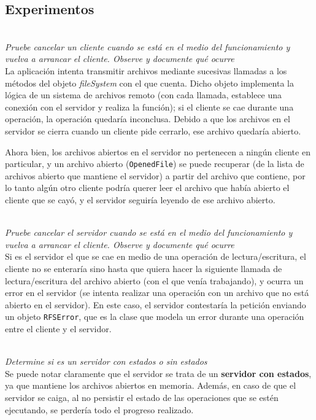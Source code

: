 \subsection{Experimentos}

~\\
\emph{Pruebe cancelar un cliente cuando se está en el medio del funcionamiento y vuelva a arrancar el cliente. Observe y documente qué ocurre} 
~\\

La aplicación intenta transmitir archivos mediante sucesivas llamadas a los métodos del objeto \emph{fileSystem} con el que cuenta. Dicho objeto implementa la lógica de un sistema de archivos remoto (con cada llamada, establece una conexión con el servidor y realiza la función); si el cliente se cae durante una operación, la operación quedaría inconclusa. Debido a que los archivos en el servidor se cierra cuando un cliente pide cerrarlo, ese archivo quedaría abierto. 

Ahora bien, los archivos abiertos en el servidor no pertenecen a ningún cliente en particular, y un archivo abierto (\texttt{OpenedFile}) se puede recuperar (de la lista de archivos abierto que mantiene el servidor) a partir del archivo que contiene, por lo tanto algún otro cliente podría querer leer el archivo que había abierto el cliente que se cayó, y el servidor seguiría leyendo de ese archivo abierto.

~\\
\emph{Pruebe cancelar el servidor cuando se está en el medio del funcionamiento y vuelva a arrancar el cliente.  Observe y documente qué ocurre} 
~\\

Si es el servidor el que se cae en medio de una operación de lectura/escritura, el cliente no se enteraría sino hasta que quiera hacer la siguiente llamada de lectura/escritura del archivo abierto (con el que venía trabajando), y ocurra un error en el servidor (se intenta realizar una operación con un archivo que no está abierto en el servidor). En este caso, el servidor contestaría la petición enviando un objeto \texttt{RFSError}, que es la clase que modela un error durante una operación entre el cliente y el servidor. 

~\\
\emph{Determine si es un servidor con estados o sin estados} 
~\\

Se puede notar claramente que el servidor se trata de un \textbf{servidor con estados}, ya que mantiene los archivos abiertos en memoria. Además, en caso de que el servidor se caiga, al no persistir el estado de las operaciones que se estén ejecutando, se perdería todo el progreso realizado. 


